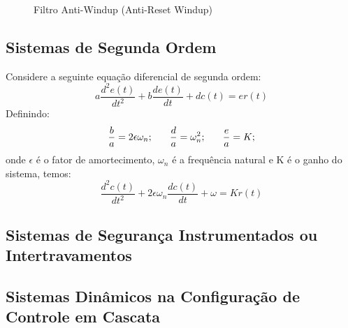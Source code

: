\begin{enumerate}
\begin{enumerate}
\begin{figure}[h]
                            \caption{Filtro Anti-Windup (Anti-Reset Windup)}
                            \label{fig:filtro_anti_windup}
                        \end{figure}
        \end{enumerate}
\end{enumerate}
\newpage

\subsection{Sistemas de Segunda Ordem}
\hspace{4ex}Considere a seguinte equação diferencial de segunda ordem:
    \[a\frac{d^2e(t)}{dt^2}+b\frac{de(t)}{dt}+dc(t)=er(t)\]
Definindo:
    \[\frac{b}{a}=2\epsilon\omega_n; \hspace{4ex} \frac{d}{a}=\omega^2_n; \hspace{4ex} \frac{e}{a}=K;\]
onde \(\epsilon\) é o fator de amortecimento, \(\omega_n\) é a frequência natural e K é o ganho do sistema, temos:
    \[\frac{d^2c(t)}{dt^2}+2\epsilon\omega_n\frac{dc(t)}{dt}+\omega = Kr(t)\]

\subsection{Sistemas de Segurança Instrumentados ou Intertravamentos}\hspace{4ex}

\subsection{Sistemas Dinâmicos na Configuração de Controle em Cascata}\hspace{4ex}